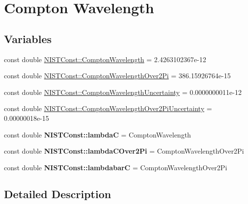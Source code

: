 \hypertarget{group___compton_wavelength}{}\section{Compton Wavelength}
\label{group___compton_wavelength}
\subsection*{Variables}
\begin{DoxyCompactItemize}
\item 
const double \hyperlink{group___compton_wavelength_ga6f9b597d657bd3e9add13a76516cbabc}{N\+I\+S\+T\+Const\+::\+Compton\+Wavelength} = 2.\+4263102367e-\/12
\item 
const double \hyperlink{group___compton_wavelength_ga5031f85750fecb545f0353cb05bb7c69}{N\+I\+S\+T\+Const\+::\+Compton\+Wavelength\+Over2\+Pi} = 386.\+15926764e-\/15
\item 
const double \hyperlink{group___compton_wavelength_ga4845f956ea0bf6f4eaf7396173b09430}{N\+I\+S\+T\+Const\+::\+Compton\+Wavelength\+Uncertainty} = 0.\+0000000011e-\/12
\item 
const double \hyperlink{group___compton_wavelength_ga900f59720b26696c75d2ce455d686a57}{N\+I\+S\+T\+Const\+::\+Compton\+Wavelength\+Over2\+Pi\+Uncertainty} = 0.\+00000018e-\/15
\item 
\mbox{\label{group___compton_wavelength_gae311e27b1f359b90efb6895ddf388a80}} 
const double {\bfseries N\+I\+S\+T\+Const\+::lambdaC} = Compton\+Wavelength
\item 
\mbox{\label{group___compton_wavelength_gadaf3906a9db23eece3ac4e130978a8ce}} 
const double {\bfseries N\+I\+S\+T\+Const\+::lambda\+C\+Over2\+Pi} = Compton\+Wavelength\+Over2\+Pi
\item 
\mbox{\label{group___compton_wavelength_gaeed48ca7330a4ba9227043237fed90f9}} 
const double {\bfseries N\+I\+S\+T\+Const\+::lambdabarC} = Compton\+Wavelength\+Over2\+Pi
\end{DoxyCompactItemize}


\subsection{Detailed Description}


